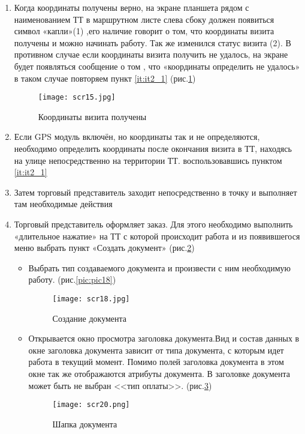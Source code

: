 \begin{enumerate}[\thesection .1]
\item Когда координаты получены верно, на экране планшета рядом с наименованием ТТ в маршрутном листе слева сбоку должен появиться символ «капли»(1) ,его наличие говорит о том, что координаты визита получены и можно начинать работу. Так же изменился статус визита (2).
В противном случае если координаты визита получить не удалось, на экране будет появляться сообщение о том , что «координаты определить не удалось» в таком случае  повторяем пункт \ref{it:it2_1}
(рис.\ref{pic:pic15})
\begin{figure}[!h]
	\texttt{[image: scr15.jpg]} 
	\caption{Координаты визита получены}\label{pic:pic15}
\end{figure}
\item Если GPS модуль включён, но координаты так и не определяются, необходимо определить координаты после окончания визита в ТТ, находясь на улице непосредственно на территории ТТ. воспользовавшись пунктом \ref{it:it2_1}

\item Затем торговый представитель заходит непосредственно в точку и выполняет там необходимые действия

\item \label{sec:sec3_1} Торговый представитель оформляет заказ. Для этого необходимо выполнить «длительное нажатие»  на ТТ с которой происходит работа  и из появившегося меню выбрать пункт «Создать документ»
(рис.\ref{pic:pic17})
\begin{itemize}
\item Выбрать тип создаваемого документа и произвести с ним необходимую работу.
(рис.\ref{pic:pic18})
\begin{figure}[!h]
	\begin{floatrow}
		{\caption{Создание документа}\label{pic:pic17}}
		{\texttt{[image: scr18.jpg]}}         
	\end{floatrow}
\end{figure}
\item Открывается окно просмотра заголовка документа.Вид и состав данных в окне заголовка документа зависит от типа документа, с которым идет работа в текущий момент. Помимо полей заголовка документа в этом окне так же отображаются атрибуты документа. 
В заголовке документа может быть не выбран <<тип оплаты>>.
(рис.\ref{pic:pic20})
\begin{figure}[!h]
	\texttt{[image: scr20.png]} 
	\caption{Шапка документа}\label{pic:pic20}
\end{figure}


\end{itemize}
\end{enumerate}
